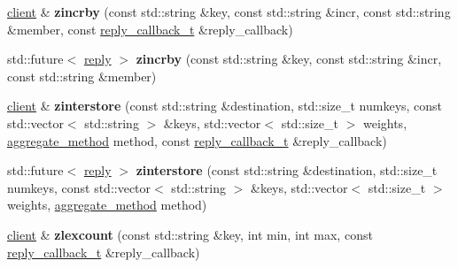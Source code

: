 \begin{DoxyCompactItemize}
\item 
\mbox{\label{classcpp__redis_1_1client_a6f0b61b420ebc8e054c766c6f5034096}} 
\mbox{\hyperlink{classcpp__redis_1_1client}{client}} \& {\bfseries zincrby} (const std\+::string \&key, const std\+::string \&incr, const std\+::string \&member, const \mbox{\hyperlink{classcpp__redis_1_1client_af7a65eb21aa25230bfbb0b0203c4fc04}{reply\+\_\+callback\+\_\+t}} \&reply\+\_\+callback)
\item 
\mbox{\label{classcpp__redis_1_1client_a202a2adbf6e0d127ad1c5cc301754e5b}} 
std\+::future$<$ \mbox{\hyperlink{classcpp__redis_1_1reply}{reply}} $>$ {\bfseries zincrby} (const std\+::string \&key, const std\+::string \&incr, const std\+::string \&member)
\item 
\mbox{\label{classcpp__redis_1_1client_aba828bd2d118708967d6645cb3f4e305}} 
\mbox{\hyperlink{classcpp__redis_1_1client}{client}} \& {\bfseries zinterstore} (const std\+::string \&destination, std\+::size\+\_\+t numkeys, const std\+::vector$<$ std\+::string $>$ \&keys, std\+::vector$<$ std\+::size\+\_\+t $>$ weights, \mbox{\hyperlink{classcpp__redis_1_1client_aa197ca5b36da793c701d3ba388ec4946}{aggregate\+\_\+method}} method, const \mbox{\hyperlink{classcpp__redis_1_1client_af7a65eb21aa25230bfbb0b0203c4fc04}{reply\+\_\+callback\+\_\+t}} \&reply\+\_\+callback)
\item 
\mbox{\label{classcpp__redis_1_1client_a30cc5402d6eea0bc8bac884c5b9738f9}} 
std\+::future$<$ \mbox{\hyperlink{classcpp__redis_1_1reply}{reply}} $>$ {\bfseries zinterstore} (const std\+::string \&destination, std\+::size\+\_\+t numkeys, const std\+::vector$<$ std\+::string $>$ \&keys, std\+::vector$<$ std\+::size\+\_\+t $>$ weights, \mbox{\hyperlink{classcpp__redis_1_1client_aa197ca5b36da793c701d3ba388ec4946}{aggregate\+\_\+method}} method)
\item 
\mbox{\label{classcpp__redis_1_1client_ad4a8fef29a047724ad4e97eedfb53c62}} 
\mbox{\hyperlink{classcpp__redis_1_1client}{client}} \& {\bfseries zlexcount} (const std\+::string \&key, int min, int max, const \mbox{\hyperlink{classcpp__redis_1_1client_af7a65eb21aa25230bfbb0b0203c4fc04}{reply\+\_\+callback\+\_\+t}} \&reply\+\_\+callback)
\item 

\end{DoxyCompactItemize}
